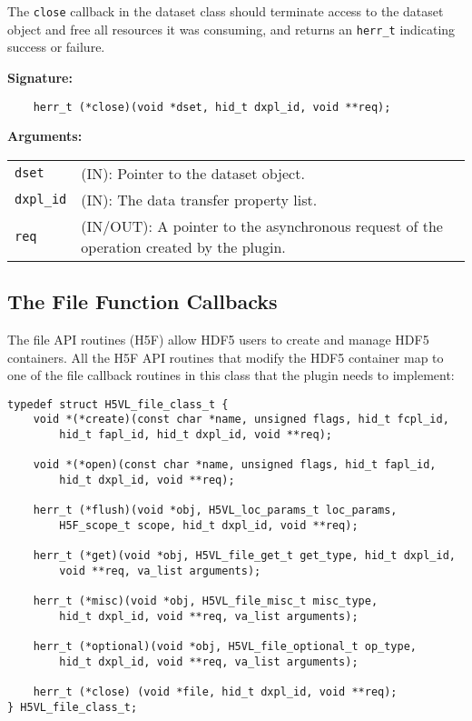 The {\tt close} callback in the dataset class should terminate access
to the dataset object and free all resources it was consuming, and
returns an {\tt herr\_t} indicating success or failure.

\textbf{Signature:}
\begin{lstlisting}
    herr_t (*close)(void *dset, hid_t dxpl_id, void **req);
\end{lstlisting}

\textbf{Arguments:}\\
\begin{tabular}{l p{10cm}}
  {\tt dset} & (IN): Pointer to the dataset object.\\
  {\tt dxpl\_id} & (IN): The data transfer property list.\\
  {\tt req} & (IN/OUT): A pointer to the asynchronous request of the
  operation created by the plugin.\\
\end{tabular}

\subsection{The File Function Callbacks}
The file API routines (H5F) allow HDF5 users to create and manage HDF5
containers. All the H5F API routines that modify the HDF5 container
map to one of the file callback routines in this class that the plugin
needs to implement:

\begin{lstlisting}
typedef struct H5VL_file_class_t {
    void *(*create)(const char *name, unsigned flags, hid_t fcpl_id,
        hid_t fapl_id, hid_t dxpl_id, void **req);

    void *(*open)(const char *name, unsigned flags, hid_t fapl_id, 
        hid_t dxpl_id, void **req);

    herr_t (*flush)(void *obj, H5VL_loc_params_t loc_params, 
        H5F_scope_t scope, hid_t dxpl_id, void **req);

    herr_t (*get)(void *obj, H5VL_file_get_t get_type, hid_t dxpl_id, 
        void **req, va_list arguments);

    herr_t (*misc)(void *obj, H5VL_file_misc_t misc_type, 
        hid_t dxpl_id, void **req, va_list arguments);

    herr_t (*optional)(void *obj, H5VL_file_optional_t op_type, 
        hid_t dxpl_id, void **req, va_list arguments);

    herr_t (*close) (void *file, hid_t dxpl_id, void **req);
} H5VL_file_class_t;
\end{lstlisting}

